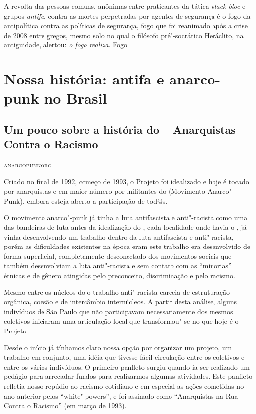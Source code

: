 A revolta das pessoas comuns, anônimas entre praticantes da tática
\emph{black bloc} e grupos \emph{antifa}, contra as mortes perpetradas
por agentes de segurança é o fogo da antipolítica contra as políticas de
segurança, fogo que foi reanimado após a crise de 2008 entre gregos,
mesmo solo no qual o filósofo pré"-socrático Heráclito, na antiguidade,
alertou: \emph{o fogo realiza}. Fogo!


\part{Nossa história: antifa e anarco-punk no Brasil}

\chapter{Um pouco sobre a história do  -- Anarquistas Contra o Racismo}

\hfill{}\textsc{anarcopunkorg}

\bigskip

Criado no final de 1992, começo de 1993, o Projeto  foi idealizado e hoje é tocado por anarquistas e em maior número por militantes do  (Movimento Anarco"-Punk), embora esteja aberto a participação de tod@s.

O movimento anarco"-punk já tinha a luta antifascista e anti"-racista como uma das bandeiras de luta antes da idealização do , cada localidade onde havia o , já vinha desenvolvendo um trabalho dentro da luta antifascista e anti"-racista, porém as dificuldades existentes na época eram este trabalho era desenvolvido de forma superficial, completamente desconectado dos movimentos sociais que também desenvolviam a luta anti"-racista e sem contato com as ``minorias'' étnicas e de gênero atingidas pelo preconceito, discriminação e pelo racismo.

Mesmo entre os núcleos do  o trabalho anti"-racista carecia de estruturação orgânica, coesão e de intercâmbio internúcleos. A partir desta análise, alguns indivíduos de São Paulo que não participavam necessariamente dos mesmos coletivos iniciaram uma articulação local que transformou"-se no que hoje é o Projeto 

Desde o início já tínhamos claro nossa opção por organizar um projeto, um trabalho em conjunto, uma idéia que tivesse fácil circulação entre os coletivos e entre os vários indivíduos. O primeiro panfleto surgiu quando ia ser realizado um pedágio para arrecadar fundos para realizarmos algumas atividades. Este panfleto refletia nosso repúdio ao racismo cotidiano e em especial as ações cometidas no ano anterior pelos ``white"-powers'', e foi assinado como ``Anarquistas na Rua Contra o Racismo'' (em março de 1993).

